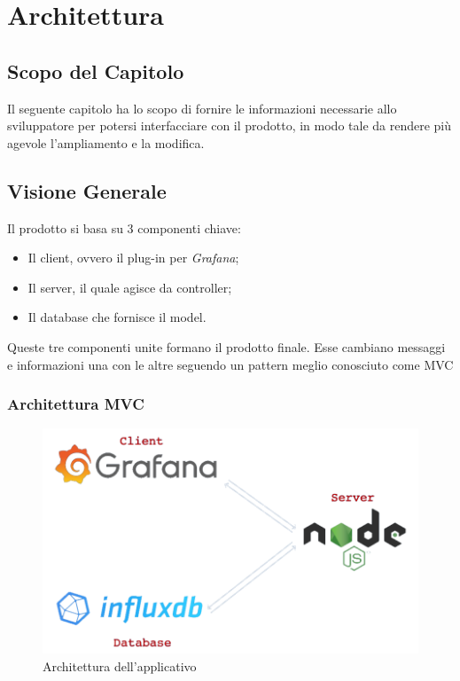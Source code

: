 \section{Architettura}\label{architettura}
\subsection{Scopo del Capitolo}
Il seguente capitolo ha lo scopo di fornire le informazioni necessarie allo sviluppatore per potersi interfacciare con il prodotto, in modo tale da rendere più agevole l'ampliamento e la modifica.

\subsection{Visione Generale}\label{archGenerale}
Il prodotto si basa su 3 componenti chiave: 
\begin{itemize}
	\item Il client, ovvero il plug-in per \textit{Grafana}; 
	\item Il server, il quale agisce da controller; 
	\item Il database che fornisce il model.
\end{itemize}
Queste tre componenti unite formano il prodotto finale. Esse cambiano messaggi e informazioni una con le altre seguendo un pattern meglio conosciuto come MVC\glossario 

\subsubsection{Architettura MVC}
\begin{figure}[H]
	\begin{center}
		\includegraphics[scale=0.5]{./images/architettura.png} 
	\end{center}
	\caption{Architettura dell'applicativo}
\end{figure}

